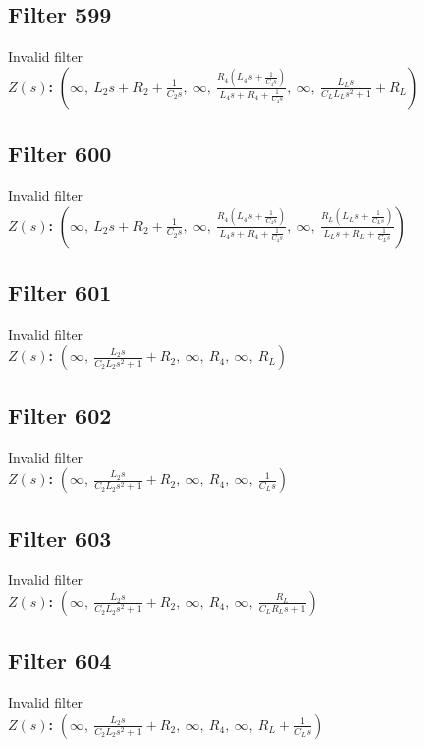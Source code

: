 \documentclass{article}
\begin{document}
\subsection*{Filter 599}
Invalid filter \\ 
\textbf{$Z(s)$:} $\left( \infty, \  L_{2} s + R_{2} + \frac{1}{C_{2} s}, \  \infty, \  \frac{R_{4} \left(L_{4} s + \frac{1}{C_{4} s}\right)}{L_{4} s + R_{4} + \frac{1}{C_{4} s}}, \  \infty, \  \frac{L_{L} s}{C_{L} L_{L} s^{2} + 1} + R_{L}\right)$ \\ 
\subsection*{Filter 600}
Invalid filter \\ 
\textbf{$Z(s)$:} $\left( \infty, \  L_{2} s + R_{2} + \frac{1}{C_{2} s}, \  \infty, \  \frac{R_{4} \left(L_{4} s + \frac{1}{C_{4} s}\right)}{L_{4} s + R_{4} + \frac{1}{C_{4} s}}, \  \infty, \  \frac{R_{L} \left(L_{L} s + \frac{1}{C_{L} s}\right)}{L_{L} s + R_{L} + \frac{1}{C_{L} s}}\right)$ \\ 
\subsection*{Filter 601}
Invalid filter \\ 
\textbf{$Z(s)$:} $\left( \infty, \  \frac{L_{2} s}{C_{2} L_{2} s^{2} + 1} + R_{2}, \  \infty, \  R_{4}, \  \infty, \  R_{L}\right)$ \\ 
\subsection*{Filter 602}
Invalid filter \\ 
\textbf{$Z(s)$:} $\left( \infty, \  \frac{L_{2} s}{C_{2} L_{2} s^{2} + 1} + R_{2}, \  \infty, \  R_{4}, \  \infty, \  \frac{1}{C_{L} s}\right)$ \\ 
\subsection*{Filter 603}
Invalid filter \\ 
\textbf{$Z(s)$:} $\left( \infty, \  \frac{L_{2} s}{C_{2} L_{2} s^{2} + 1} + R_{2}, \  \infty, \  R_{4}, \  \infty, \  \frac{R_{L}}{C_{L} R_{L} s + 1}\right)$ \\ 
\subsection*{Filter 604}
Invalid filter \\ 
\textbf{$Z(s)$:} $\left( \infty, \  \frac{L_{2} s}{C_{2} L_{2} s^{2} + 1} + R_{2}, \  \infty, \  R_{4}, \  \infty, \  R_{L} + \frac{1}{C_{L} s}\right)$ \\ 
\end{document}
